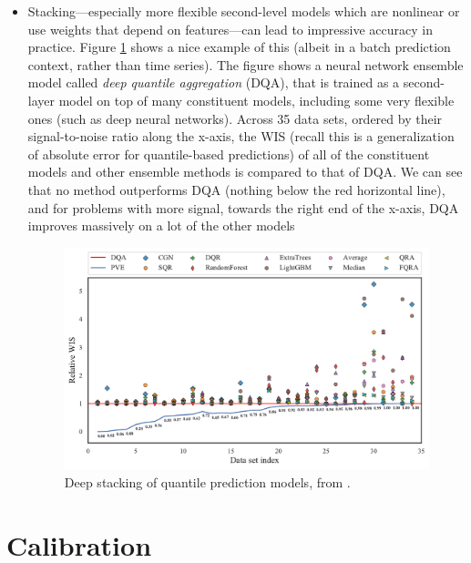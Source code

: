 \documentclass{article}
\begin{document}
\begin{itemize}
\item Stacking---especially more flexible second-level models which are
  nonlinear or use weights that depend on features---can lead to impressive
  accuracy in practice. Figure \ref{fig:fakoor} shows a nice example of this
  (albeit in a batch prediction context, rather than time series). The figure
  shows a neural network ensemble model called \emph{deep quantile aggregation}
  (DQA), that is trained as a second-layer model on top of many constituent
  models, including some very flexible ones (such as deep neural
  networks). Across 35 data sets, ordered by their signal-to-noise ratio along 
  the x-axis, the WIS (recall this is a generalization of absolute error for
  quantile-based predictions) of all of the constituent models and other
  ensemble methods is compared to that of DQA. We can see that no method
  outperforms DQA (nothing below the red horizontal line), and for problems with
  more signal, towards the right end of the x-axis, DQA improves massively on a
  lot of the other models   

\begin{figure}[htb]
\centering
\includegraphics[width=\textwidth]{fakoor.pdf}
\caption{Deep stacking of quantile prediction models, from 
  \citet{fakoor2023flexible}.}   
\label{fig:fakoor}
\end{figure}
\end{itemize}

\section{Calibration}
\end{document}

